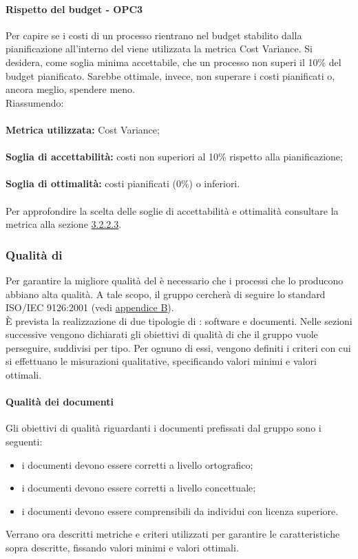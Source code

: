 \documentclass[PianoDiQualifica.tex]{subfiles}
\begin{document}
			\paragraph{Rispetto del budget - OPC3}
			Per capire se i costi di un processo rientrano nel budget stabilito dalla pianificazione all'interno del \PPdocRR{} viene utilizzata la metrica Cost Variance.
			Si desidera, come soglia minima accettabile, che un processo non superi il 10\% del budget pianificato. Sarebbe ottimale, invece, non superare i costi pianificati o, ancora meglio,
			spendere meno.\\
			Riassumendo: \\ \\
			\textbf{Metrica utilizzata:} Cost Variance; \\ \\
			\textbf{Soglia di accettabilità:} costi non superiori al 10\% rispetto alla pianificazione; \\ \\
			\textbf{Soglia di ottimalità:}  costi pianificati (0\%) o inferiori. \\ \\
			Per approfondire la scelta delle soglie di accettabilità e ottimalità consultare la metrica alla sezione \hyperlink{Cost_m}{3.2.2.3}.
			
		\subsubsection{Qualità di }
		Per garantire la migliore qualità del  è necessario che i processi che lo producono abbiano alta qualità.
		A tale scopo, il gruppo \GRUPPO{} cercherà di seguire lo standard ISO/IEC 9126:2001 (vedi \hyperlink{ISOIEC}{appendice B}). \\
		È prevista la realizzazione di due tipologie di : software e documenti.
		Nelle sezioni successive vengono dichiarati gli obiettivi di qualità di  che il gruppo vuole perseguire, suddivisi per tipo.
		Per ognuno di essi, vengono definiti i criteri con cui si effettuano le misurazioni qualitative, specificando valori minimi e valori ottimali.
		
			\paragraph{Qualità dei documenti}
			Gli obiettivi di qualità riguardanti i documenti prefissati dal gruppo \GRUPPO{} sono i seguenti:
			\begin{itemize}
				\item i documenti devono essere corretti a livello ortografico;
				\item i documenti devono essere corretti a livello concettuale;
				\item i documenti devono essere comprensibili da individui con licenza superiore.
			\end{itemize}
			Verrano ora descritti metriche e criteri utilizzati per garantire le caratteristiche sopra descritte, fissando valori minimi e valori ottimali.
			
\end{document}
